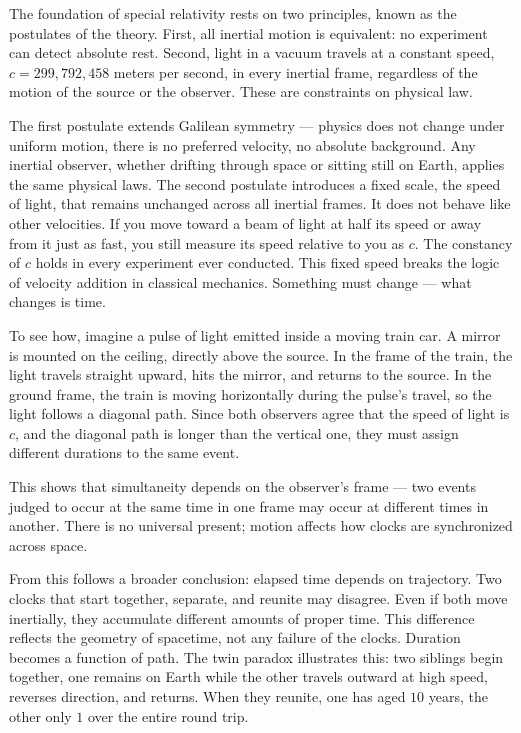 The foundation of special relativity rests on two principles, known as the postulates of the theory. First, all inertial motion is equivalent: no experiment can detect absolute rest. Second, light in a vacuum travels at a constant speed, $c = 299{,}792{,}458$ meters per second, in every inertial frame, regardless of the motion of the source or the observer. These are constraints on physical law.

The first postulate extends Galilean symmetry — physics does not change under uniform motion, there is no preferred velocity, no absolute background. Any inertial observer, whether drifting through space or sitting still on Earth, applies the same physical laws. The second postulate introduces a fixed scale, the speed of light, that remains unchanged across all inertial frames. It does not behave like other velocities. If you move toward a beam of light at half its speed or away from it just as fast, you still measure its speed relative to you as $c$. The constancy of $c$ holds in every experiment ever conducted. This fixed speed breaks the logic of velocity addition in classical mechanics. Something must change — what changes is time.

To see how, imagine a pulse of light emitted inside a moving train car. A mirror is mounted on the ceiling, directly above the source. In the frame of the train, the light travels straight upward, hits the mirror, and returns to the source. In the ground frame, the train is moving horizontally during the pulse's travel, so the light follows a diagonal path. Since both observers agree that the speed of light is $c$, and the diagonal path is longer than the vertical one, they must assign different durations to the same event.

This shows that simultaneity depends on the observer's frame — two events judged to occur at the same time in one frame may occur at different times in another. There is no universal present; motion affects how clocks are synchronized across space.

From this follows a broader conclusion: elapsed time depends on trajectory. Two clocks that start together, separate, and reunite may disagree. Even if both move inertially, they accumulate different amounts of proper time. This difference reflects the geometry of spacetime, not any failure of the clocks. Duration becomes a function of path. The twin paradox illustrates this: two siblings begin together, one remains on Earth while the other travels outward at high speed, reverses direction, and returns. When they reunite, one has aged $10$ years, the other only $1$ over the entire round trip.


